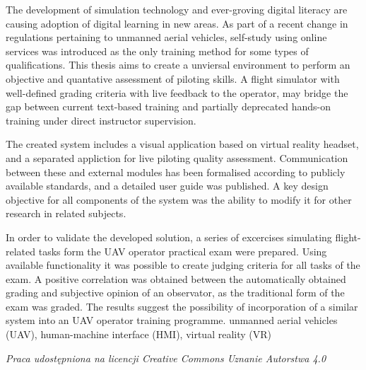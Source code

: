 \documentclass[
    a4paper,
    left=25mm,         %
    right=25mm,        %
    top=25mm,          %
    bottom=25mm,         %
    bindingoffset=5mm,  %
    nohyphenation=false %
]{src/wut-thesis}
\begin{document}
\newpage
\abstract The development of simulation technology and ever-groving digital literacy are causing adoption of digital learning in new areas. As part of a recent change in regulations pertaining to unmanned aerial vehicles, self-study using online services was introduced as the only training method for some types of qualifications. This thesis aims to create a unviersal environment to perform an objective and quantative assessment of piloting skills. A flight simulator with well-defined grading criteria with live feedback to the operator, may bridge the gap between current text-based training and partially deprecated hands-on training under direct instructor supervision.

The created system includes a visual application based on virtual reality headset, and a separated appliction for live piloting quality assessment. Communication between these and external modules has been formalised according to publicly available standards, and a detailed user guide was published. A key design objective for all components of the system was the ability to modify it for other research in related subjects.

In order to validate the developed solution, a series of excercises simulating flight-related tasks form the UAV operator practical exam were prepared. Using available functionality it was possible to create judging criteria for all tasks of the exam. A positive correlation was obtained between the automatically obtained grading and subjective opinion of an observator, as the traditional form of the exam was graded. The results suggest the possibility of incorporation of a similar system into an UAV operator training programme.
\keywords unmanned aerial vehicles (UAV), human-machine interface (HMI), virtual reality (VR)

\cleardoublepage  %
\pagestyle{plain}
\makeauthorship

\cleardoublepage %
{
  \noindent
  \emph{Praca udostępniona na licencji Creative Commons Uznanie Autorstwa 4.0\cite{lic:ccby}}
}
\tableofcontents

\cleardoublepage %
\pagestyle{headings}
\end{document}
